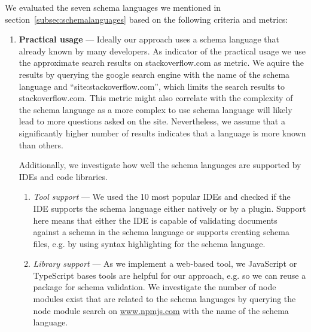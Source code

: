 We evaluated the seven schema languages we mentioned in section~\ref{subsec:schemalanguages} based on the following criteria and metrics:
\begin{enumerate}
    \item \textbf{Practical usage} --- Ideally our approach uses a schema language that already known by many developers. 
    As indicator of the practical usage we use the approximate search results on stackoverflow.com as metric.
    We aquire the results by querying the google search engine with the name of the schema language and ``site:stackoverflow.com'', which limits the search results to stackoverflow.com.
    This metric might also correlate with the complexity of the schema language as a more complex to use schema language will likely lead to more questions asked on the site. Nevertheless, we assume that a significantly higher number of results indicates that a language is more known than others.

    Additionally, we investigate how well the schema languages are supported by IDEs and code libraries.
    \begin{enumerate}
        \item \textit{Tool support} --- We used the 10 most popular IDEs\cite{mostpopularides} and checked if the IDE supports the schema language either natively or by a plugin. Support here means that either the IDE is capable of validating documents against a schema in the schema language or supports creating schema files, e.g. by using syntax highlighting for the schema language.
        \item \textit{Library support} --- As we implement a web-based tool, we JavaScript or TypeScript bases tools are helpful for our approach, e.g. so we can reuse a package for schema validation. We investigate the number of node modules exist that are related to the schema languages by querying the node module search on \url{www.npmjs.com} with the name of the schema language.

    \end{enumerate}


\end{enumerate}
